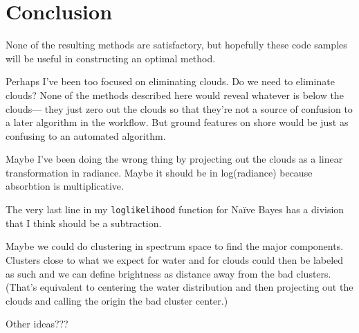 \documentclass[12pt]{article}
\begin{document}
\section{Conclusion}

None of the resulting methods are satisfactory, but hopefully these
code samples will be useful in constructing an optimal method.

Perhaps I've been too focused on eliminating clouds.  Do we need to
eliminate clouds?  None of the methods described here would reveal
whatever is below the clouds--- they just zero out the clouds so that
they're not a source of confusion to a later algorithm in the
workflow.  But ground features on shore would be just as confusing to
an automated algorithm.

Maybe I've been doing the wrong thing by projecting out the clouds as
a linear transformation in radiance.  Maybe it should be in
log(radiance) because absorbtion is multiplicative.

The very last line in my {\tt loglikelihood} function for Na\"ive
Bayes has a division that I think should be a subtraction.

Maybe we could do clustering in spectrum space to find the major
components.  Clusters close to what we expect for water and for clouds
could then be labeled as such and we can define brightness as distance
away from the bad clusters.  (That's equivalent to centering the water
distribution and then projecting out the clouds and calling the origin
the bad cluster center.)

Other ideas???
\end{document}
